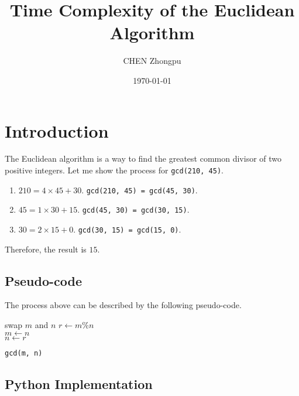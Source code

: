 \documentclass{article}
\title{Time Complexity of the Euclidean Algorithm} %
\author{CHEN Zhongpu} %
\date{\today} %
\theoremstyle{plain}
\begin{document}
\maketitle %


\section{Introduction} %
The Euclidean algorithm is a way to find the greatest common divisor of two positive integers. Let me show the process for \texttt{gcd(210, 45)}.

\begin{enumerate}
	\item $210 = 4 \times 45 + 30$. \texttt{gcd(210, 45) = gcd(45, 30)}.
	\item $45 = 1 \times 30 + 15$. \texttt{gcd(45, 30) = gcd(30, 15)}.
	\item $30 = 2 \times 15 + 0$. \texttt{gcd(30, 15) = gcd(15, 0)}.
\end{enumerate}

Therefore, the result is $15$.

\subsection{Pseudo-code}

The process above can be described by the following pseudo-code.

\begin{algorithm}[H]
	\medskip
	 {
		swap $m$ and $n$
	}
	 {
		$r \gets m \% n$ \\
		$m \gets n$ \\
		$n \gets r$ \\
	}
	\caption{\texttt{gcd(m, n)}} %
\end{algorithm}

\subsection{Python Implementation}
\end{document}
